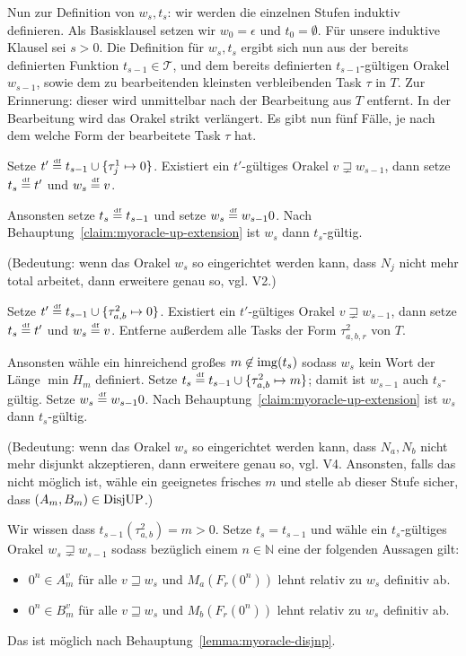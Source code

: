 Nun zur Definition von $w_s, t_s$: wir werden die einzelnen Stufen induktiv definieren. Als Basisklausel setzen wir $w_0 = \epsilon$ und $t_0 = \emptyset$.
Für unsere induktive Klausel sei $s>0$. Die Definition für $w_s, t_s$ ergibt sich nun aus der bereits definierten Funktion $t_{s-1}\in\mathcal T$, und dem bereits definierten $t_{s-1}$-gültigen Orakel $w_{s-1}$, sowie dem zu bearbeitenden kleinsten verbleibenden Task $\tau$ in $T$.
Zur Erinnerung: dieser wird unmittelbar nach der Bearbeitung aus $T$ entfernt. In der Bearbeitung wird das Orakel strikt verlängert.
Es gibt nun fünf Fälle, je nach dem welche Form der bearbeitete Task $\tau$ hat.
\begin{description}[leftmargin=\parindent]
    \item[Task $\tau^1_j$:] Setze $t'\stackrel{\text{\smash{\tiny df}}}{=} t_{s-1}\cup\{\tau^1_j\mapsto 0\}$. Existiert ein $t'$-gültiges Orakel $v\sqsupsetneq w_{s-1}$, dann setze $t_s\stackrel{\text{\smash{\tiny df}}}{=} t'$ und $w_s\stackrel{\text{\smash{\tiny df}}}{=} v$.

        Ansonsten setze $t_s\stackrel{\text{\smash{\tiny df}}}{=} t_{s-1}$ und setze $w_s\stackrel{\text{\smash{\tiny df}}}{=} w_{s-1}0$. Nach Behauptung~\ref{claim:myoracle-up-extension} ist $w_s$ dann $t_s$-gültig.

        (Bedeutung: wenn das Orakel $w_s$ so eingerichtet werden kann, dass $N_j$ nicht mehr total arbeitet, dann erweitere genau so, vgl. V2.) 

    \item[Task $\tau^2_{a,b}$:] Setze $t'\stackrel{\text{\smash{\tiny df}}}{=} t_{s-1}\cup\{\tau^2_{a,b}\mapsto 0\}$. Existiert ein $t'$-gültiges Orakel $v\sqsupsetneq w_{s-1}$, dann setze $t_s\stackrel{\text{\smash{\tiny df}}}{=} t'$ und $w_s\stackrel{\text{\smash{\tiny df}}}{=} v$. Entferne außerdem alle Tasks der Form $\tau^2_{a,b,r}$ von $T$.

        Ansonsten wähle ein hinreichend großes $m\not\in \operatorname{img}(t_s)$ sodass $w_s$ kein Wort der Länge $\min H_m$ definiert. Setze $t_s\stackrel{\text{\smash{\tiny df}}}{=} t_{s-1}\cup \{ \tau^2_{a,b}\mapsto m \}$; damit ist $w_{s-1}$ auch $t_s$-gültig. Setze $w_s\stackrel{\text{\smash{\tiny df}}}{=} w_{s-1}0$. Nach Behauptung~\ref{claim:myoracle-up-extension} ist $w_s$ dann $t_s$-gültig.

        (Bedeutung: wenn das Orakel $w_s$ so eingerichtet werden kann, dass $N_a, N_b$ nicht mehr disjunkt akzeptieren, dann erweitere genau so, vgl. V4. Ansonsten, falls das nicht möglich ist, wähle ein geeignetes frisches $m$ und stelle ab dieser Stufe sicher, dass $(A_m, B_m)\in \mathrm{DisjUP}$.) 

    \item[Task $\tau^2_{a,b,r}$:] Wir wissen dass $t_{s-1}(\tau^2_{a,b})=m>0$. Setze $t_s=t_{s-1}$ und wähle ein $t_s$-gültiges Orakel $w_s\sqsupsetneq w_{s-1}$ sodass bezüglich einem $n\in\mathbb N$ eine der folgenden Aussagen gilt:
        \begin{itemize}[nosep,endpenalty=10000]
            \item $0^n\in A_m^v$ für alle $v\sqsupseteq w_s$ und $M_a(F_r(0^n))$ lehnt relativ zu $w_s$ definitiv ab.
            \item $0^n\in B_m^v$ für alle $v\sqsupseteq w_s$ und $M_b(F_r(0^n))$ lehnt relativ zu $w_s$ definitiv ab.
        \end{itemize} Das ist möglich nach Behauptung~\ref{lemma:myoracle-disjnp}.


\end{description}
